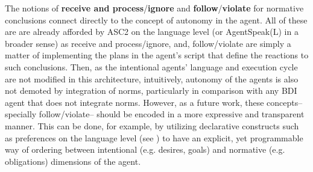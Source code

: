 The notions of \textbf{receive and process}/\textbf{ignore} and \textbf{follow}/\textbf{violate} for normative conclusions connect directly to the concept of autonomy in the agent. All of these are are already afforded by ASC2 on the language level (or AgentSpeak(L) in a broader sense) as receive and process/ignore, and, follow/violate are simply a matter of implementing the plans in the agent's script that define the reactions to such conclusions. Then, as the intentional agents' language and execution cycle are not modified in this architecture, intuitively, autonomy of the agents is also not demoted by integration of norms, particularly in comparison with any BDI agent that does not integrate norms. However, as a future work, these concepts-- specially follow/violate-- should be encoded in a more expressive and transparent manner. This can be done, for example, by utilizing declarative constructs such as preferences on the language level (see \cite{Mohajeriparizi2022Preference}) to have an explicit, yet programmable way of ordering between intentional (e.g. desires, goals) and normative (e.g. obligations) dimensions of the agent.



%

%
%
%
%

